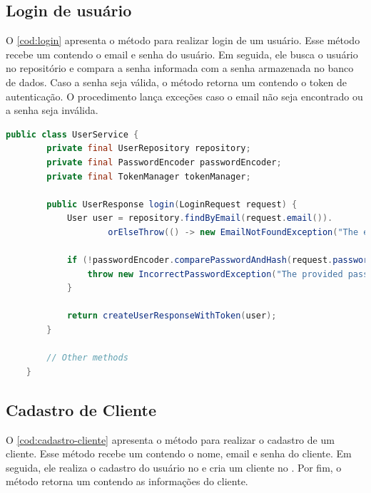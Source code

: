 \subsection{Login de usuário}
O \autoref{cod:login} apresenta o método para realizar login de um usuário. Esse método recebe um  contendo o email e senha do usuário. Em seguida, ele busca o usuário no repositório e compara a senha informada com a senha armazenada no banco de dados. Caso a senha seja válida, o método retorna um  contendo o token de autenticação. O procedimento lança exceções caso o email não seja encontrado ou a senha seja inválida.

\begin{codigo}[H]
    \begin{lstlisting}[language=Java]
    public class UserService {
        private final UserRepository repository;
        private final PasswordEncoder passwordEncoder;
        private final TokenManager tokenManager;

        public UserResponse login(LoginRequest request) {
            User user = repository.findByEmail(request.email()).
                    orElseThrow(() -> new EmailNotFoundException("The email '%s' could not be found.", request.email()));

            if (!passwordEncoder.comparePasswordAndHash(request.password(), user.getPassword())) {
                throw new IncorrectPasswordException("The provided password is incorrect.");
            }

            return createUserResponseWithToken(user);
        }

        // Other methods
    }
    \end{lstlisting}
    \caption{Método para realizar login}
    \label{cod:login}
\end{codigo}

\subsection{Cadastro de Cliente}
O \autoref{cod:cadastro-cliente} apresenta o método para realizar o cadastro de um cliente. Esse método recebe um  contendo o nome, email e senha do cliente. Em seguida, ele realiza o cadastro do usuário no  e cria um cliente no . Por fim, o método retorna um  contendo as informações do cliente.

